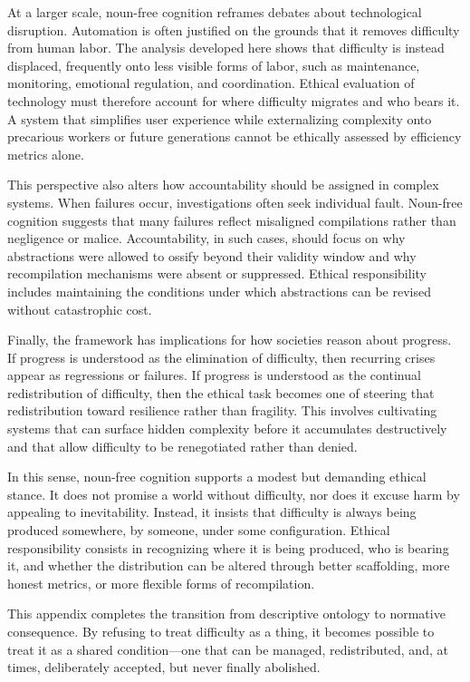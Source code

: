 \documentclass[12pt]{article}
\begin{document}
At a larger scale, noun-free cognition reframes debates about technological disruption. Automation is often justified on the grounds that it removes difficulty from human labor. The analysis developed here shows that difficulty is instead displaced, frequently onto less visible forms of labor, such as maintenance, monitoring, emotional regulation, and coordination. Ethical evaluation of technology must therefore account for where difficulty migrates and who bears it. A system that simplifies user experience while externalizing complexity onto precarious workers or future generations cannot be ethically assessed by efficiency metrics alone.

This perspective also alters how accountability should be assigned in complex systems. When failures occur, investigations often seek individual fault. Noun-free cognition suggests that many failures reflect misaligned compilations rather than negligence or malice. Accountability, in such cases, should focus on why abstractions were allowed to ossify beyond their validity window and why recompilation mechanisms were absent or suppressed. Ethical responsibility includes maintaining the conditions under which abstractions can be revised without catastrophic cost.

Finally, the framework has implications for how societies reason about progress. If progress is understood as the elimination of difficulty, then recurring crises appear as regressions or failures. If progress is understood as the continual redistribution of difficulty, then the ethical task becomes one of steering that redistribution toward resilience rather than fragility. This involves cultivating systems that can surface hidden complexity before it accumulates destructively and that allow difficulty to be renegotiated rather than denied.

In this sense, noun-free cognition supports a modest but demanding ethical stance. It does not promise a world without difficulty, nor does it excuse harm by appealing to inevitability. Instead, it insists that difficulty is always being produced somewhere, by someone, under some configuration. Ethical responsibility consists in recognizing where it is being produced, who is bearing it, and whether the distribution can be altered through better scaffolding, more honest metrics, or more flexible forms of recompilation.

This appendix completes the transition from descriptive ontology to normative consequence. By refusing to treat difficulty as a thing, it becomes possible to treat it as a shared condition—one that can be managed, redistributed, and, at times, deliberately accepted, but never finally abolished.
\end{document}
